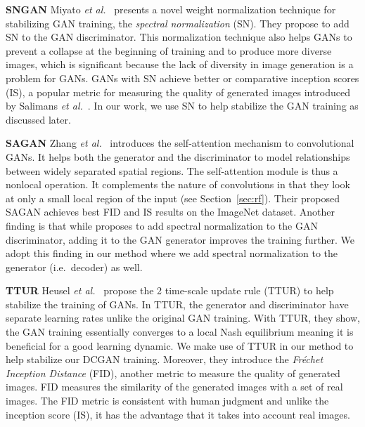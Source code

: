\documentclass[a4paper,12pt]{report}
\begin{document}
\par \textbf{SNGAN} Miyato \textit{et al.}~\cite{SNGAN} presents a novel weight normalization technique for stabilizing GAN training, the \textit{spectral normalization} (SN). They propose to add SN to the GAN discriminator. This normalization technique also helps GANs to prevent a collapse at the beginning of training and to produce more diverse images, which is significant because the lack of diversity in image generation is a problem for GANs. GANs with SN achieve better or comparative inception scores (IS), a popular metric for measuring the quality of generated images introduced by Salimans \textit{et al.}~\cite{ImprTechn4TrainGANs}. In our work, we use SN to help stabilize the GAN training as discussed later.

\par \textbf{SAGAN} Zhang \textit{et al.}~\cite{SAGAN} introduces the self-attention mechanism to convolutional GANs. It helps both the generator and the discriminator to model relationships between widely separated spatial regions. The self-attention module is thus a nonlocal operation. It complements the nature of convolutions in that they look at only a small local region of the input (see Section~\ref{sec:rf}). Their proposed SAGAN achieves best FID and IS results on the ImageNet dataset. Another finding is that while \cite{SNGAN} proposes to add spectral normalization to the GAN discriminator, adding it to the GAN generator improves the training further. We adopt this finding in our method where we add spectral normalization to the generator (i.e.\ decoder) as well. 

\par \textbf{TTUR} Heusel \textit{et al.}~\cite{TTUR} propose the 2 time-scale
update rule (TTUR) to help stabilize the training of GANs. In TTUR, the generator and discriminator have separate learning rates unlike the original GAN training. With TTUR, they show, the GAN training essentially converges to a local Nash equilibrium meaning it is beneficial for a good learning dynamic. We make use of TTUR in our method to help stabilize our DCGAN training. Moreover, they introduce the \textit{Fréchet Inception Distance} (FID), another metric to measure the quality of generated images. FID measures the similarity of the generated images with a set of real images. The FID metric is consistent with human judgment and unlike the inception score (IS), it has the advantage that it takes into account real images.
\end{document}
